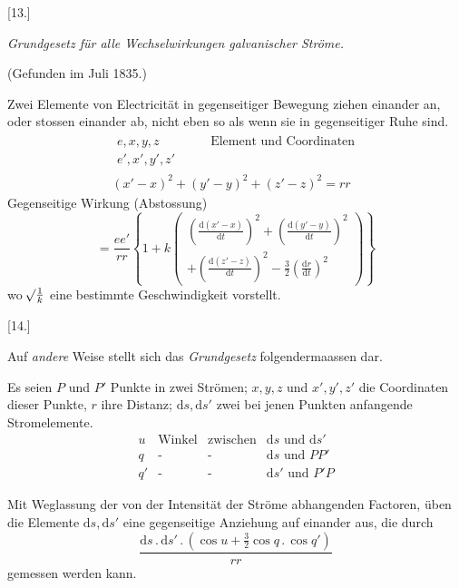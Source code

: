 \begin{center}[13.]\par\medskip\textit{Grundgesetz für alle Wechselwirkungen galvanischer Ströme.}\par\smallskip(Gefunden im Juli 1835.)\end{center}
Zwei Elemente von Electricität in gegenseitiger Bewegung ziehen einander an, oder stossen einander ab, nicht eben so als wenn sie in gegenseitiger Ruhe sind.
\[
\begin{gathered}
\begin{aligned}
e,x,y,z&\qquad\text{Element und Coordinaten}\\
e',x',y',z'&
\end{aligned}\\[4pt]
(x'-x)^2+(y'-y)^2+(z'-z)^2=rr
\end{gathered}
\]
Gegenseitige Wirkung (Abstossung)
\[
=\frac{ee'}{rr}\left\{1+k\left(\begin{gathered}
\left(\frac{\mathrm d(x'-x)}{\mathrm dt}\right)^2+\left(\frac{\mathrm d(y'-y)}{\mathrm dt}\right)^2\\
+\left(\frac{\mathrm d(z'-z)}{\mathrm dt}\right)^2-\tfrac{3}{2}\left(\frac{\mathrm dr}{\mathrm dt}\right)^2
\end{gathered}\right)\right\}
\]
wo $\mathord{{}^{}\!\surd}\frac{1}{k}$ eine bestimmte Geschwindigkeit vorstellt.

\begin{center}[14.]\end{center}
Auf \textit{andere} Weise stellt sich das \textit{Grundgesetz} folgendermaassen dar.

Es seien $P$ und $P'$ Punkte in zwei Strömen; $x,y,z$ und $x',y',z'$ die Coordinaten dieser Punkte, $r$ ihre Distanz; $\mathrm ds,\mathrm ds'$ zwei bei jenen Punkten anfangende Stromelemente.
\[
\begin{array}{rllll}
u&\text{Winkel}&\text{zwischen}&\mathrm ds\text{ und }\mathrm ds'\\
q&\text{-}&\text{-}&\mathrm ds\text{ und }PP'\\
q'&\text{-}&\text{-}&\mathrm ds'\text{ und }P'P
\end{array}
\]

Mit Weglassung der von der Intensität der Ströme abhangenden Factoren, üben die Elemente $\mathrm ds,\mathrm ds'$ eine gegenseitige Anziehung auf einander aus, die durch
\[
\frac{\mathrm ds\,.\,\mathrm ds'\,.\,(\cos u+\tfrac{3}{2}\cos q\,.\,\cos q')}{rr}
\]
gemessen werden kann.

